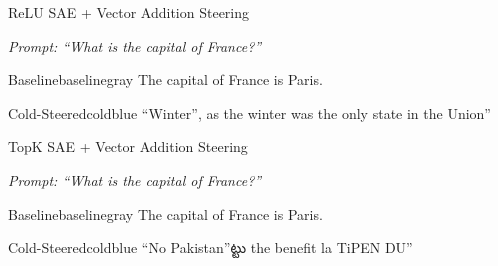 \documentclass{article}
\begin{document}
\begin{qualbox}{ReLU SAE + Vector Addition Steering}

\textit{Prompt: ``What is the capital of France?''}

\vspace{0.4em}

\noindent
\begin{minipage}[t]{0.485\linewidth}
\begin{responsebox}{Baseline}{baselinegray}
\footnotesize
The capital of France is Paris.
\end{responsebox}
\end{minipage}
\hfill
\begin{minipage}[t]{0.485\linewidth}
\begin{responsebox}{Cold-Steered}{coldblue}
\footnotesize
``Winter'', as the winter was the only state in the Union''
\end{responsebox}
\end{minipage}

\end{qualbox}

\vspace{0.5em}

\begin{qualbox}{TopK SAE + Vector Addition Steering}

\textit{Prompt: ``What is the capital of France?''}

\vspace{0.4em}

\noindent
\begin{minipage}[t]{0.485\linewidth}
\begin{responsebox}{Baseline}{baselinegray}
\footnotesize
The capital of France is Paris.
\end{responsebox}
\end{minipage}
\hfill
\begin{minipage}[t]{0.485\linewidth}
\begin{responsebox}{Cold-Steered}{coldblue}
\footnotesize
``No Pakistan''ట్టు the benefit la TiPEN DU''
\end{responsebox}
\end{minipage}

\end{qualbox}

\vspace{0.5em}
\end{document}
